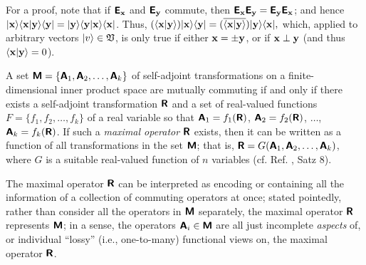{\color{OliveGreen}\bproof
For a proof,
note that if $\textsf{\textbf{E}}_{\bf x}$ and $\textsf{\textbf{E}}_{\bf y}$ commute, then
$\textsf{\textbf{E}}_{\bf x}\textsf{\textbf{E}}_{\bf y} =  \textsf{\textbf{E}}_{\bf y}    \textsf{\textbf{E}}_{\bf x}$; and
hence $
\vert {\bf x} \rangle \langle {\bf x} \vert {\bf y} \rangle \langle {\bf y} \vert
=
\vert {\bf y} \rangle \langle {\bf y} \vert {\bf x} \rangle \langle {\bf x} \vert $. Thus,
$
(
\langle {\bf x} \vert {\bf y} \rangle )\vert {\bf x} \rangle  \langle {\bf y}  \vert
=
(\overline{\langle {\bf x} \vert {\bf y} \rangle})
\vert {\bf y} \rangle  \langle {\bf x} \vert  ,
$
which, applied to arbitrary vectors $ \vert   v\rangle \in {\frak V}$, is only true if either ${\bf x} = \pm {\bf y}$,
or if ${\bf x} \perp {\bf y}$ (and thus $\langle {\bf x} \vert {\bf y} \rangle =0$).
\eproof
}



A set $\textsf{\textbf{M}}
=
\{
\textsf{\textbf{A}}_1,
\textsf{\textbf{A}}_2,
\ldots ,
\textsf{\textbf{A}}_k
\}
$
of  self-adjoint transformations on a finite-dimensional inner product space
are mutually commuting if and only if there exists
a self-adjoint transformation  $\textsf{\textbf{R}}$ and
a set of real-valued functions
$F
=
\{
f_1,
f_2,
\ldots ,
f_k
\}
$ of a real variable so that
$
\textsf{\textbf{A}}_1=f_1 (\textsf{\textbf{R}})
$,
$
\textsf{\textbf{A}}_2=f_2 (\textsf{\textbf{R}})
$,
$\ldots $,
$\textsf{\textbf{A}}_k=f_k (\textsf{\textbf{R}})$.
If such a {\em maximal operator} $\textsf{\textbf{R}}$ exists, then
it can be written as a function of all transformations in the set $\textsf{\textbf{M}}$; that is,
$\textsf{\textbf{R}}=G(\textsf{\textbf{A}}_1,
\textsf{\textbf{A}}_2,
\ldots ,
\textsf{\textbf{A}}_k)$,
where $G$ is a suitable real-valued function of $n$ variables
(cf. Ref. \cite{v-neumann-31}, Satz 8).

The  maximal operator $\textsf{\textbf{R}}$ can be interpreted as
encoding or containing all the information of a collection of commuting operators at once;
stated pointedly, rather than consider all the  operators in $\textsf{\textbf{M}}$
separately,
the  maximal operator  $\textsf{\textbf{R}}$  represents  $\textsf{\textbf{M}}$;
in a sense, the operators  $\textsf{\textbf{A}}_i \in \textsf{\textbf{M}}$
are all just incomplete {\em aspects}  of,
or individual ``lossy'' (i.e., one-to-many) functional views on, the  maximal operator $\textsf{\textbf{R}}$.

